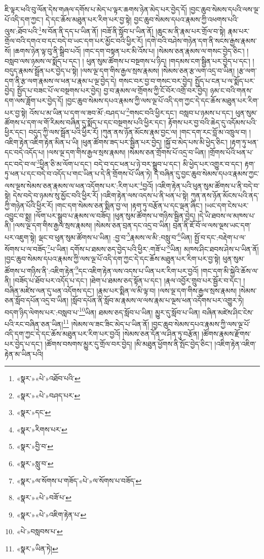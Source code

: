 ཇི་ལྟར་ཕའི་བུ་ལོན་དེས་གཞལ་དགོས་པ་མེད་པ་ལྟར་ཆགས་ཉེན་མེད་པར་བྱེད་དོ། །བྱང་ཆུབ་སེམས་དཔའི་ལས་ལྔ་པོ་འདི་དག་ཀྱང་། དེ་དང་ཆོས་མཐུན་པར་རིག་པར་བྱ་སྟེ། བྱང་ཆུབ་སེམས་དཔའ་རྣམས་ཀྱི་འཕགས་པའི་ལུས་:ཐོབ་པའི་\footnote{«སྣར་»«པེ་»འཐོབ་པའི་}ས་བོན་ནི་དད་པ་ཡིན་ནོ། །བཟོ་ནི་སློབ་པ་ཡིན་ནོ། །ཆུང་མ་ནི་རྣམ་པར་གྲོལ་བ་སྟེ། རྣམ་པར་གྲོལ་བའི་དགའ་བ་དང་བདེ་བ་ཡང་དག་པར་མྱོང་བའི་ཕྱིར་རོ། །དགེ་བའི་བཤེས་གཉེན་དག་ནི་སངས་རྒྱས་རྣམས་སོ། །ཆགས་ཉེན་ལྟ་བུ་ནི་སྒྲིབ་པའོ། །གང་དག་བསྟན་པར་མི་འོས་པ། །སེམས་ཅན་རྣམས་ལ་གསང་བྱེད་ཅིང་། །བསླབ་ལས་ཉམས་ལ་སྨོད་པ་དང་། །
ཕུན་སུམ་ཚོགས་པ་བསྔགས་པ་ཉིད། །གདམས་ངག་སྦྱིན་པར་བྱེད་པ་དང་། །བདུད་རྣམས་སྦྲོན་པར་བྱེད་པ་སྟེ། །ལས་ལྔ་དག་གིས་རྒྱལ་སྲས་རྣམས། །སེམས་ཅན་རྩ་ལག་འདྲ་བ་ཡིན། །རྩ་ལག་དག་ནི་རྩ་ལག་རྣམས་ལ་ཕན་པ་རྣམ་པ་ལྔ་བྱེད་དེ། གསང་བར་བྱ་བ་གསང་བར་བྱེད། སྤྱོད་པ་ངན་པ་ལ་སྨོད་པར་བྱེད། སྤྱོད་པ་བཟང་པོ་ལ་བསྔགས་པར་བྱེད། བྱ་བ་རྣམས་ལ་གྲོགས་ཀྱི་ངོ་བོར་འགྲོ་བར་བྱེད། ཉམ་ང་བའི་གནས་དག་ལས་ཟློག་པར་བྱེད་དོ། །བྱང་ཆུབ་སེམས་དཔའ་རྣམས་ཀྱི་ལས་ལྔ་པོ་འདི་དག་ཀྱང་དེ་དང་ཆོས་མཐུན་པར་རིག་པར་བྱ་སྟེ། འོས་པ་མ་ཡིན་པ་དག་ལ་ཟབ་མོ་:བཤད་པ་\footnote{«སྣར་»«པེ་»བཤད་པར་}གསང་བའི་ཕྱིར་དང་། བསླབ་པ་ཉམས་པ་དང་། ཕུན་སུམ་ཚོགས་པ་དག་ལ་གོ་རིམས་བཞིན་དུ་སྨོད་པ་དང་བསྔགས་པའི་ཕྱིར་དང་། རྟོགས་པར་བྱ་བའི་ཆེད་དུ་འདོམས་པའི་ཕྱིར་དང་། བདུད་ཀྱི་ལས་སྦྲོན་པའི་ཕྱིར་རོ། །ཀུན་ནས་ཉོན་མོངས་རྣམ་བྱང་ལ། །གང་དག་རང་བློ་མ་འཁྲུལ་བ། །འཇིག་རྟེན་འཇིག་རྟེན་མིན་པ་ཡི། །ཕུན་ཚོགས་ཟད་པར་སྦྱིན་པར་བྱེད། །སྐྱོ་བ་མེད་པས་མི་ཕྱེད་ཅིང་། །རྟག་ཏུ་ཕན་དང་བདེ་འདོད་པ། །ལས་ལྔ་དག་གིས་རྒྱལ་སྲས་རྣམས། །སེམས་ཅན་གྲོགས་པོ་འདྲ་བ་ཡིན། །གྲོགས་པོའི་ཕན་པ་དང་བདེ་བ་ལ་\footnote{«སྣར་»དང་}ཕྱིན་ཅི་མ་ལོག་པ་དང་། བདེ་བ་དང་ཕན་པ་ཉེ་བར་སྒྲུབ་པ་དང་། མི་ཕྱེད་པར་འགྱུར་བ་དང་། རྟག་ཏུ་ཕན་པ་དང་བདེ་བ་འདོད་པ་གང་ཡིན་པ་དེ་ནི་གྲོགས་པོ་ཡིན་ཏེ། དེ་བཞིན་དུ་བྱང་ཆུབ་སེམས་དཔའ་རྣམས་ཀྱང་ལས་ལྔས་སེམས་ཅན་རྣམས་ལ་ཕན་འདོགས་པར་:རིག་པར་\footnote{«སྣར་»རིགས་པར་}བྱའོ། །འཇིག་རྟེན་པའི་ཕུན་སུམ་ཚོགས་པ་ནི་བདེ་བ་སྟེ། དེས་བདེ་བ་ཉམས་སུ་མྱོང་བའི་ཕྱིར་རོ། །འཇིག་རྟེན་ལས་འདས་པ་ནི་ཕན་པ་སྟེ། ཀུན་ནས་ཉོན་མོངས་པའི་ནད་ཀྱི་གཉེན་པོའི་ཕྱིར་རོ། །གང་དག་སེམས་ཅན་སྨིན་བྱ་ལ། །རྟག་ཏུ་བརྩོན་པ་དང་ལྡན་ཞིང་། །ཡང་དག་ངེས་པར་འབྱུང་བ་སྨྲ། །ལོག་པར་སྒྲུབ་པ་རྣམས་ལ་བཟོད། །ཕུན་སུམ་ཚོགས་པ་གཉིས་སྦྱིན་བྱེད། །དེ་ཡི་ཐབས་ལ་མཁས་པ་ནི། །ལས་ལྔ་དག་གིས་རྒྱལ་སྲས་རྣམས། །སེམས་ཅན་བྲན་དང་འདྲ་བ་ཡིན། བྲན་ནི་ཇོ་བོ་ལ་ལས་ལྔས་ཡང་དག་པར་འཇུག་སྟེ། ལྡང་བ་ཕུན་སུམ་ཚོགས་པ་ཡིན། :བྱ་བ་\footnote{«སྣར་»བྱི་བ་}རྣམས་ལ་མི་:བསླུ་བ་\footnote{«སྣར་»སླུ་བ་}ཡིན། སྤྱོ་བ་དང་:བརྡེག་པ་ལ་སོགས་པ་ལ་བཟོད་\footnote{«སྣར་»ལ་སོགས་པ་གཟོད་«པེ་»ལ་སོགས་པ་བཟོད་}པ་ཡིན། དགོས་པ་ཐམས་ཅད་བྱེད་པའི་ཕྱིར་:གཟོ་པ་\footnote{«སྣར་»«པེ་»བཟོ་པ་}ཡིན། མཁས་ཤིང་ཐབས་ཤེས་པ་ཡིན་ནོ། །བྱང་ཆུབ་སེམས་དཔའ་རྣམས་ཀྱི་ལས་ལྔ་པོ་འདི་དག་ཀྱང་དེ་དང་ཆོས་མཐུན་པར་རིག་པར་བྱ་སྟེ། ཕུན་སུམ་ཚོགས་པ་གཉིས་ནི་:འཇིག་རྟེན་\footnote{«སྣར་»«པེ་»འཇིག་རྟེན་པ་}དང་འཇིག་རྟེན་ལས་འདས་པ་ཡིན་པར་རིག་པར་བྱའོ། །གང་དག་མི་སྐྱེའི་ཆོས་ལ་ནི། །བཟོད་པ་ཐོབ་པར་འདོད་པ་དང་། །ཐེག་པ་ཐམས་ཅད་སྟོན་པ་དང་། །རྣལ་འབྱོར་གྲུབ་པར་སྦྱོར་བ་དང་། །བཞིན་མཛེས་ལན་དུ་ཕན་འདོགས་དང་། །རྣམ་པར་སྨིན་ལ་མི་ལྟ་བ། །ལས་ལྔ་དག་གིས་རྒྱལ་སྲས་རྣམས། །སེམས་ཅན་སློབ་དཔོན་འདྲ་བ་ཡིན། །སློབ་དཔོན་ནི་སློབ་མ་རྣམས་ལ་ལས་རྣམ་པ་ལྔས་ཕན་འདོགས་པར་འགྱུར་ཏེ། བདག་ཉིད་ལེགས་པར་:བསླབ་པ་\footnote{«པེ་»བསླབས་པ་}ཡིན། ཐམས་ཅད་སློབ་པ་ཡིན། མྱུར་དུ་སློབ་པ་ཡིན། བཞིན་མཛེས་ཤིང་ངེས་པའི་རང་བཞིན་ཅན་ཡིན།\footnote{«སྣར་»ཡིན་ཏེ།} །སེམས་ལ་ཟང་ཟིང་མེད་པ་ཡིན་ནོ། །བྱང་ཆུབ་སེམས་དཔའ་རྣམས་ཀྱི་ལས་ལྔ་པོ་འདི་དག་ཀྱང་དེ་དང་ཆོས་མཐུན་པར་རིག་པར་བྱའོ། །སེམས་ཅན་དོན་ལ་ཤིན་ཏུ་བརྩོན། །ཚོགས་རྣམས་རྫོགས་པར་བྱེད་པ་དང་། །ཚོགས་བསགས་མྱུར་དུ་གྲོལ་བར་བྱེད། །མི་མཐུན་ཕྱོགས་ནི་སྤོང་བྱེད་ཅིང་། །འཇིག་རྟེན་འཇིག་རྟེན་མ་ཡིན་པའི། 